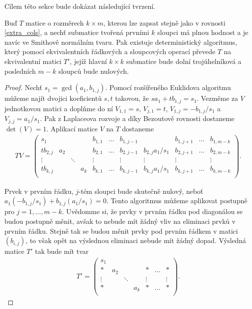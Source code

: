 Cílem této sekce bude dokázat následující tvrzení.
\begin{vet} \label{Zero_extra}
Buď $ T $ matice o rozměrech $ k \times m $, kterou lze zapsat stejně jako
v rovnosti \ref{extra_cols}, a nechť submatice tvořená prvními $ k $ sloupci má
plnou hodnost a je navíc ve Smithově normálním tvaru.
Pak existuje deterministický algoritmus, který pomocí ekvivalentních řádkových
a sloupcových operací převede $ T $ na ekvivalentní matici $ T' $, jejíž
hlavní $ k \times k $ submatice bude dolní trojúhelníková a posledních $ m - k $
sloupců bude nulových.
\end{vet}
\begin{proof}
Nechť $ s_1 = \gcd(a_1, b_{1,j}) $. Pomocí rozšířeného Euklidova algoritmu
můžeme najít dvojici koeficientů $ s, t $ takovou, že
$ s a_1 + t b_{1,j} = s_1 $. Vezměme za $ V $ jednotkovou matici a doplňme do ní
$ V_{1,1} = s $, $ V_{j,1} = t $, $ V_{1,j} = -b_{1,j} / s_1 $ a
$ V_{j,j} = a_1 / s_1 $. Pak z Laplaceova rozvoje a díky Bezoutově rovnosti
dostaneme $ \det(V) = 1 $. Aplikací matice $ V $ na $ T $ dostaneme
\begin{align*}
TV =
    \left(
    \begin{array}{cccc|ccccccc}
        s_1      &     &        &     & b_{1,1} & \hdots & b_{1,j-1} &                   & b_{1,j+1} & \hdots & b_{1,m-k} \\
        tb_{2,j} & a_2 &        &     & b_{2,1} & \hdots & b_{2,j-1} & b_{2,j} a_1 / s_1 & b_{2,j+1} & \hdots & b_{2,m-k} \\
        \vdots   &     & \ddots &     & \vdots  &        & \vdots    & \vdots            & \vdots    &        & \vdots    \\
        tb_{k,j} &     &        & a_k & b_{k,1} & \hdots & b_{k,j-1} & b_{k,j} a_1 / s_1 & b_{k,j+1} & \hdots & b_{k,m-k} \\
    \end{array}
    \right).
\end{align*}

Prvek v prvním řádku, $ j $-tém sloupci bude skutečně nulový, neboť
$ a_1 (-b_{1,j} / s_1) +  b_{1,j} (a_1 / s_1) = 0 $. Tento algoritmus můžeme
aplikovat postupně pro $ j = 1,\dots,m-k $. Uvědomme si, že prvky v prvním řádku
pod diagonálou se budou postupně měnit, avšak to nebude mít žádný vliv na
eliminaci prvků v prvním řádku. Stejně tak se budou měnit prvky pod prvním řádkem
v matici $ (b_{i,j}) $, to však opět na výslednou eliminaci nebude mít žádný
dopad. Výsledná matice $ T' $ tak bude mít tvar
\begin{align*}
T' =
    \left(
    \begin{array}{cccc|ccc}
        s_1    &     &        &     &         &        &           \\
        \ast   & a_2 &        &     & \ast    & \hdots & \ast      \\
        \vdots &     & \ddots &     & \vdots  &        & \vdots    \\
        \ast   &     &        & a_k & \ast    & \hdots & \ast      \\
    \end{array}
    \right).
\end{align*}


\end{proof}
